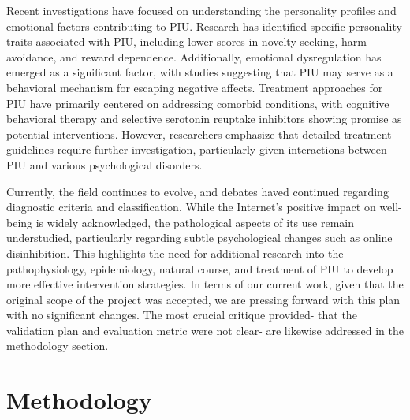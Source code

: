 \documentclass[12pt]{extarticle}
\newcommand{\todo}{\textcolor{red}{TODO:}~}
\begin{document}
    Recent investigations have focused on understanding the personality profiles and emotional factors contributing to PIU. Research has identified specific personality traits associated with PIU, including lower scores in novelty seeking, harm avoidance, and reward dependence. 
    Additionally, emotional dysregulation has emerged as a significant factor, with studies suggesting that PIU may serve as a behavioral mechanism for escaping negative affects.
    Treatment approaches for PIU have primarily centered on addressing comorbid conditions, with cognitive behavioral therapy and selective serotonin reuptake inhibitors showing promise as potential interventions.
    However, researchers emphasize that detailed treatment guidelines require further investigation, particularly given interactions between PIU and various psychological disorders.

    Currently, the field continues to evolve, and debates haved continued regarding diagnostic criteria and classification. While the Internet's positive impact on well-being is widely acknowledged, the pathological aspects of its use remain understudied, particularly regarding subtle psychological changes such as online disinhibition. 
    This highlights the need for additional research into the pathophysiology, epidemiology, natural course, and treatment of PIU to develop more effective intervention strategies.
    In terms of our current work, given that the original scope of the project was accepted, we are pressing forward with this plan with no significant changes.
    The most crucial critique provided- that the validation plan and evaluation metric were not clear- are likewise addressed in the methodology section.


\section{Methodology} 
\end{document}
